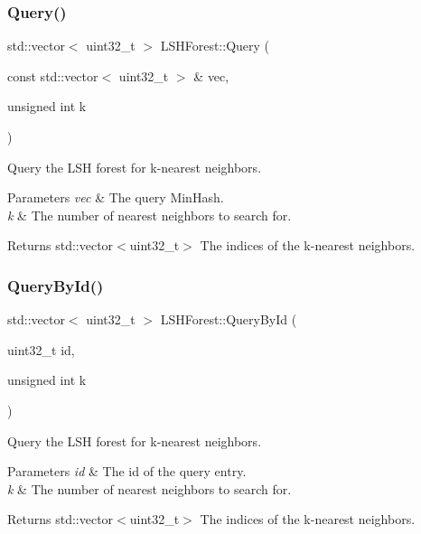 \subsubsection{\texorpdfstring{Query()}{Query()}}
{\footnotesize\ttfamily std\+::vector$<$ uint32\+\_\+t $>$ L\+S\+H\+Forest\+::\+Query (\begin{DoxyParamCaption}\item[{const std\+::vector$<$ uint32\+\_\+t $>$ \&}]{vec,  }\item[{unsigned int}]{k }\end{DoxyParamCaption})}



Query the L\+SH forest for k-\/nearest neighbors. 


\begin{DoxyParams}{Parameters}
{\em vec} & The query Min\+Hash. \\
\hline
{\em k} & The number of nearest neighbors to search for. \\
\hline
\end{DoxyParams}
\begin{DoxyReturn}{Returns}
std\+::vector$<$uint32\+\_\+t$>$ The indices of the k-\/nearest neighbors. 
\end{DoxyReturn}
\mbox{\label{classLSHForest_ade573cce99526ba05341dd506673ea8b}} 
\subsubsection{\texorpdfstring{Query\+By\+Id()}{QueryById()}}
{\footnotesize\ttfamily std\+::vector$<$ uint32\+\_\+t $>$ L\+S\+H\+Forest\+::\+Query\+By\+Id (\begin{DoxyParamCaption}\item[{uint32\+\_\+t}]{id,  }\item[{unsigned int}]{k }\end{DoxyParamCaption})}



Query the L\+SH forest for k-\/nearest neighbors. 


\begin{DoxyParams}{Parameters}
{\em id} & The id of the query entry. \\
\hline
{\em k} & The number of nearest neighbors to search for. \\
\hline
\end{DoxyParams}
\begin{DoxyReturn}{Returns}
std\+::vector$<$uint32\+\_\+t$>$ The indices of the k-\/nearest neighbors. 
\end{DoxyReturn}
\mbox{\label{classLSHForest_ada7ea3fd5c3eb9fc05188a0054de48cf}} 
